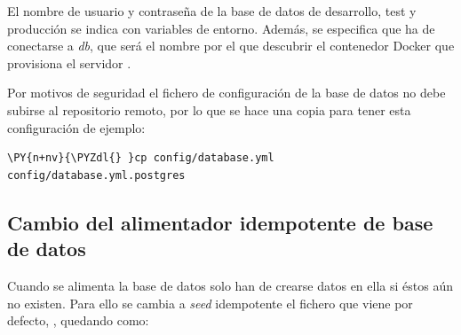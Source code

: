 El nombre de usuario y contraseña de la base de datos de desarrollo, test y producción se indica con variables de entorno. Además, se especifica que ha de conectarse a \textit{db}, que será el nombre por el que descubrir el contenedor Docker que provisiona el servidor .

Por motivos de seguridad el fichero de configuración de la base de datos no debe subirse al repositorio remoto, por lo que se hace una copia para tener esta configuración de ejemplo:

\begin{framed_shaded}
\begin{Verbatim}[fontsize=\relsize{-2.5},fontseries=b,commandchars=\\\{\}]
\PY{n+nv}{\PYZdl{} }cp config/database.yml config/database.yml.postgres
\end{Verbatim}
\end{framed_shaded}

\subsection{Cambio del alimentador idempotente de base de datos}

Cuando se alimenta la base de datos solo han de crearse datos en ella si éstos aún no existen. Para ello se cambia a \textit{seed} idempotente el fichero que viene por defecto, , quedando como:

